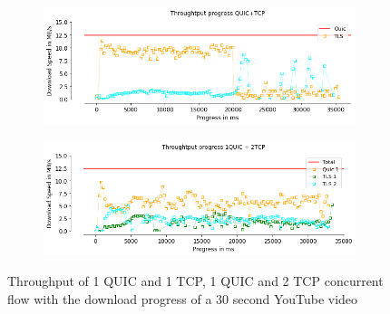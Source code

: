 \begin{frame}
\begin{figure}[!htb]
    \begin{subfigure}{0.45\textwidth}
        \includegraphics[width=\linewidth]{./plots/youtube/throughput/ThroughtputprogressQUIC+TCP.png}
    \end{subfigure}   
    \begin{subfigure}{0.45\textwidth}
        \includegraphics[width=\linewidth]{./plots/youtube/throughput/Throughtputprogress1QUIC+2TCP.png}
    \end{subfigure}
    \caption{Throughput of 1 QUIC and 1 TCP, 1 QUIC and 2 TCP concurrent flow with the download progress of a 30 second YouTube video}\label{fig:throughput-of-2}
\end{figure}

%


\end{frame}
